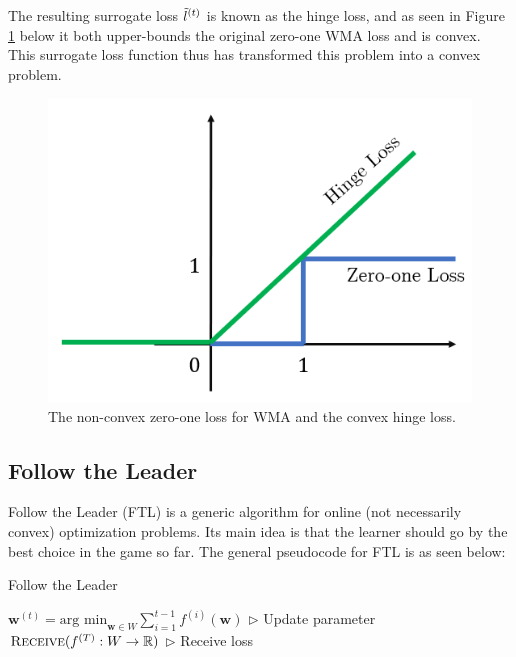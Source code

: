 \documentclass[11pt]{article}
\begin{document}
The resulting surrogate loss $\Tilde{l}^{(t)}$ is known as the hinge loss, and as seen in Figure \ref{fig:hinge} below it both upper-bounds the original zero-one WMA loss and is convex. This surrogate loss function thus has transformed this problem into a convex problem.
\begin{figure}[h]
\includegraphics[scale=0.5]{imgs/hinge.png}
\centering
\caption{The non-convex zero-one loss for WMA and the convex hinge loss.}
\label{fig:hinge}
\end{figure}

\subsection{Follow the Leader}
Follow the Leader (FTL) is a generic algorithm for online (not necessarily convex) optimization problems. Its main idea is that the learner should go by the best choice in the game so far. The general pseudocode for FTL is as seen below:

\begin{algorithm}[H]
\caption{Follow the Leader}
\label{algo:FTL}
\begin{algorithmic}[1]
\vspace{5pt}
\STATE \qquad  $\boldsymbol{w}^{(t)}=\text{arg min}_{\boldsymbol{w}\in W} \sum_{i=1}^{t-1} f^{(i)} (\boldsymbol{w})$
\vspace{5pt} \hfill $\triangleright$ Update parameter
\STATE \qquad  $\textsc{Receive}(f^{(T)}:W \rightarrow \mathbb{R})$ \hfill $\triangleright$ Receive loss
\ENDFOR

\end{algorithmic}
\end{algorithm}
\end{document}
